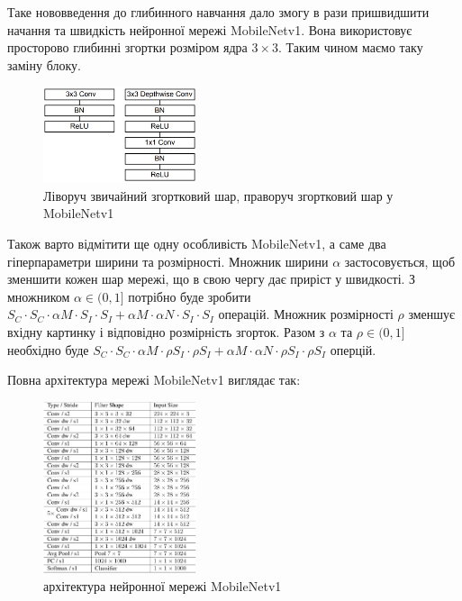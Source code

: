 Таке нововведення до глибинного навчання дало змогу в рази пришвидшити 
начання та швидкість нейронної мережі MobileNetv1. Вона використовує 
просторово глибинні згортки розміром ядра $3 \times 3$. 
Таким чином маємо таку заміну блоку.

\begin{figure}[H]
    \centering
    \includegraphics[width=0.4\textwidth]{images/cnn_mobilenetv1_conv_layer}
    \caption{Ліворуч звичайний згортковий шар, праворуч згортковий шар у MobileNetv1
    \label{fig:cnn:mobilenetv1_conv_layer}
    }
\end{figure}

Також варто відмітити ще одну особливість MobileNetv1, а саме два гіперпараметри
ширини та розмірності.
Множник ширини $\alpha$ застосовується, щоб зменшити кожен шар мережі, що 
в свою чергу дає приріст у швидкості.
З множником  $\alpha \in (0,1]$ потрібно буде зробити
$S_C · S_C · \alpha M · S_I · S_I + \alpha M · \alpha N · S_I · S_I$ операцій.
Множник розмірності $\rho$ зменшує вхідну картинку і відповідно 
розмірність згорток. Разом з $\alpha$  та $\rho \in (0,1]$ необхідно буде
$S_C · S_C · \alpha M · \rho S_I · \rho S_I + \alpha M ·\alpha  N · \rho S_I · \rho S_I$
оперцій.

Повна архітектура мережі MobileNetv1 виглядає так:

\begin{figure}[H]
    \centering
    \includegraphics[width=0.4\textwidth]{images/cnn_mobilenetv1_architecture}
    \caption{архітектура нейронної мережі MobileNetv1
    \label{fig:cnn:mobilenetv1_architecture}
    }
\end{figure}



